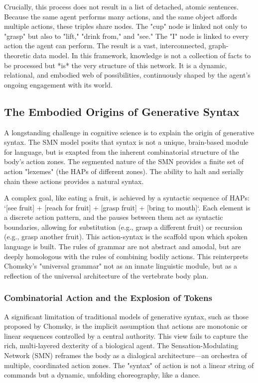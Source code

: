 Crucially, this process does not result in a list of detached, atomic sentences. Because the same agent performs many actions, and the same object affords multiple actions, these triples share nodes. The "cup" node is linked not only to "grasp" but also to "lift," "drink from," and "see." The "I" node is linked to every action the agent can perform. The result is a vast, interconnected, graph-theoretic data model. In this framework, knowledge is not a collection of facts to be processed but *is* the very structure of this network. It is a dynamic, relational, and embodied web of possibilities, continuously shaped by the agent's ongoing engagement with its world.

\subsection*{The Embodied Origins of Generative Syntax}
A longstanding challenge in cognitive science is to explain the origin of generative syntax. The SMN model posits that syntax is not a unique, brain-based module for language, but is exapted from the inherent combinatorial structure of the body's action zones. The segmented nature of the SMN provides a finite set of action "lexemes" (the HAPs of different zones). The ability to halt and serially chain these actions provides a natural syntax. 

A complex goal, like eating a fruit, is achieved by a syntactic sequence of HAPs: `[see fruit] + [reach for fruit] + [grasp fruit] + [bring to mouth]`. Each element is a discrete action pattern, and the pauses between them act as syntactic boundaries, allowing for substitution (e.g., grasp a different fruit) or recursion (e.g., grasp another fruit). This action-syntax is the scaffold upon which spoken language is built. The rules of grammar are not abstract and amodal, but are deeply homologous with the rules of combining bodily actions. This reinterprets Chomsky's "universal grammar" not as an innate linguistic module, but as a reflection of the universal architecture of the vertebrate body plan.

\subsubsection*{Combinatorial Action and the Explosion of Tokens}
A significant limitation of traditional models of generative syntax, such as those proposed by Chomsky, is the implicit assumption that actions are monotonic or linear sequences controlled by a central authority. This view fails to capture the rich, multi-layered dexterity of a biological agent. The Sensation-Modulating Network (SMN) reframes the body as a dialogical architecture—an orchestra of multiple, coordinated action zones. The "syntax" of action is not a linear string of commands but a dynamic, unfolding choreography, like a dance.

